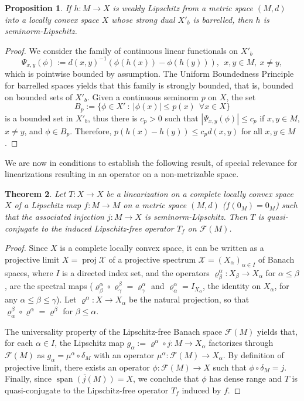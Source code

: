 \documentclass[12pt,english]{amsart}
\numberwithin{equation}{section}
\theoremstyle{plain}
\newtheorem{theorem}{Theorem}[section]
\newtheorem{proposition}[theorem]{Proposition}
\theoremstyle{definition}
\newcommand{\spa}{\operatorname{span}}
\newcommand{\proj}{\operatorname{proj}}
\newcommand{\ro}[2]{\varrho_#1^#2}
\begin{document}
\begin{proposition}\label{prop:wL-sL}
    If $h:M\to X$ is {weakly Lipschitz} from a metric space $(M,d)$ into a locally convex space $X$ whose strong dual $X'_b$ is barrelled, then $h$ is seminorm-Lipschitz. 
\end{proposition}

\begin{proof}
     We consider the family of continuous linear functionals on $X'_b$
 $$
 \Psi_{x,y}(\phi):=d(x,y)^{-1}(\phi(h(x))-\phi(h(y))), \ \ x,y\in M, \ x\neq y, 
 $$
 which is pointwise bounded by assumption. The Uniform Boundedness Principle for barrelled spaces yields that this family is strongly bounded, that is, bounded on bounded sets of $X'_b$. Given a continuous seminorm $p$ on $X$, the set 
 $$
 B_p:=\{ \phi \in X' \ : \ |\phi(x)|\leq p(x) \ \ \forall x\in X\}
 $$
 is a bounded set in $X'_b$, thus there is $c_p>0$ such that $|\Psi_{x,y}(\phi)|\leq c_p$ if $x,y\in M$, $x\neq y$, and $\phi \in B_p$. Therefore, $p(h(x)-h(y))\leq c_pd(x,y)$ for all $x,y\in M$. 
\end{proof}


We are now in conditions to establish the following result, of special relevance for linearizations resulting in an operator on a non-metrizable space. 

\begin{theorem}\label{thm:whyLF}
Let $T\colon X\to X$ be a linearization on a complete locally convex space $X$ of a Lipschitz map $f\colon M\to M$ on a metric space $(M,d)$ ($f(0_M)=0_M$) such that the associated injection $j\colon M\to X$ is seminorm-Lipschitz. Then $T$ is quasi-conjugate to the induced Lipschitz-free operator $T_f$ on $\mathcal{F}(M)$.
\end{theorem}

\begin{proof}
    Since $X$ is a complete locally convex space, it can be written as a projective limit $X= \proj {\mathcal X}$ of a projective spectrum $\mathcal X=(X_\alpha)_{\alpha\in I}$ of Banach spaces, where $I$ is a directed index set, and the operators $\ro \beta \alpha \colon X_\beta \to X_\alpha$ for $\alpha \le \beta$, are the spectral maps ($\ro \beta \alpha \circ \ro \gamma \beta = \ro  \gamma \alpha$ and $\ro \alpha \alpha =I_{X_\alpha}$, the identity on $X_\alpha$, for any $\alpha\leq\beta\leq \gamma$). Let $\varrho^\alpha\colon X\to X_\alpha$ be the natural projection, so that $\ro   \alpha \beta \circ\varrho^\alpha=\varrho^\beta$ for $\beta \leq \alpha$. 

    The universality property of the Lipschitz-free Banach space $\mathcal{F}(M)$ yields that, for each $\alpha\in I$, the Lipschitz map $g_\alpha:=\varrho^\alpha\circ j\colon  M\to X_\alpha$ factorizes through $\mathcal{F}(M)$ as $g_\alpha=\mu^\alpha\circ \delta_M$ with an operator $\mu^\alpha\colon \mathcal{F}(M)\to X_\alpha$. By definition of projective limit, there exists an operator  $\phi\colon \mathcal{F}(M)\to X$ such that $\phi\circ \delta_M=j$. Finally, since $\overline{\spa(j(M))}=X$, we conclude that $\phi$ has dense range and $T$ is quasi-conjugate to the Lipschitz-free operator $T_f$ induced by $f$.
\end{proof}
\end{document}
